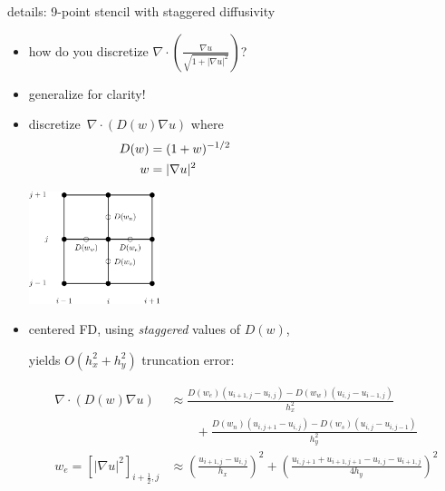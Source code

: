\documentclass[10pt,
               svgnames,
               hyperref={colorlinks,citecolor=DeepPink4,linkcolor=FireBrick,urlcolor=Maroon},
               usepdftitle=false]{beamer}
\newcommand{\grad}{\nabla}
\newcommand{\Div}{\nabla \cdot}
\newcommand{\ds}{\displaystyle}
\begin{document}
\begin{frame}{details: 9-point stencil with staggered diffusivity}
\begin{itemize}
\item how do you discretize $\ds \Div \left(\frac{\grad u}{\sqrt{1 + |\grad u|^2}}\right)$?

\medskip
\item generalize for clarity!
\item discretize \,$\ds \Div \left(D(w) \grad u\right)$ where
\begin{align*}
D(w) &= (1+w)^{-1/2} \hspace{40mm} \\
w &= |\grad u|^2
\end{align*}

\vspace{-24mm}
\hfill \includegraphics[width=0.3\textwidth]{images/msboxstencil.png}

\vspace{-8mm}
\item centered FD, using \emph{staggered} values of $D(w)$,

yields $O(h_x^2+h_y^2)$ truncation error:

{\small
\begin{align*}
\Div \left(D(w) \grad u\right) &\approx \frac{D(w_e) (u_{i+1,j} - u_{i,j}) - D(w_w) (u_{i,j} - u_{i-1,j})}{h_x^2} \\
    &\qquad + \frac{D(w_n) (u_{i,j+1} - u_{i,j}) - D(w_s) (u_{i,j} - u_{i,j-1})}{h_y^2} \\
w_e = \left[|\grad u|^2\right]_{i+\frac{1}{2},j} &\approx \left(\frac{u_{i+1,j} - u_{i,j}}{h_x}\right)^2 + \left(\frac{u_{i,j+1} + u_{i+1,j+1} - u_{i,j} - u_{i+1,j}}{4 h_y}\right)^2
\end{align*}
}
\end{itemize}
\end{frame}
\end{document}
